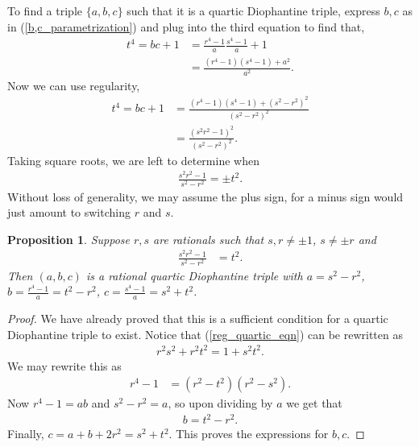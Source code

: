 \documentclass{amsart}
\newtheorem{prop}{Proposition}
\begin{document}
To find a triple $\{a,b,c\}$ such that it is a quartic Diophantine triple, express $b,c$ as in (\ref{b,c_parametrization}) and plug into the third equation to find that,
\begin{align*}
    t^4 = bc+1&= \frac{r^4-1}{a}\frac{s^4-1}{a}+1\\
        &= \frac{(r^4-1)(s^4-1)+a^2}{a^2}.
\end{align*}
Now we can use regularity,
\begin{align*}
    t^4 = bc+1 &= \frac{(r^4-1)(s^4-1)+(s^2-r^2)^2}{(s^2-r^2)^2}\\
    &= \frac{(s^2r^2-1)^2}{(s^2-r^2)^2}.
\end{align*}
Taking square roots, we are left to determine when
\begin{align*}
    \frac{s^2r^2-1}{s^2-r^2} = \pm t^2.
\end{align*}
Without loss of generality, we may assume the plus sign, for a minus sign would just amount to switching $r$ and $s$.
\begin{prop} \label{abc_definition}
Suppose $r,s$ are rationals such that $s,r\neq \pm 1$, $s\neq \pm r$ and
\begin{align} \label{reg_quartic_eqn}
    \frac{s^2r^2-1}{s^2-r^2}&= t^2.
\end{align}
Then $(a,b,c)$ is a rational quartic Diophantine triple with $a=s^2-r^2$,\\ $b=\frac{r^4-1}{a}=t^2-r^2$, $c= \frac{s^4-1}{a} = s^2+t^2$.
\end{prop}
\begin{proof}
We have already proved that this is a sufficient condition for a quartic Diophantine triple to exist. Notice that (\ref{reg_quartic_eqn}) can be rewritten as
    \begin{align*}
        r^2s^2+r^2t^2=1+s^2t^2.
    \end{align*}
We may rewrite this as
    \begin{align*}
        r^4-1&=(r^2-t^2)(r^2-s^2).
    \end{align*}
    Now $r^4-1=ab$ and $s^2-r^2=a$, so upon dividing by $a$ we get that 
    \begin{align*}
        b = t^2-r^2.
    \end{align*}
    Finally, $c=a+b+2r^2=s^2+t^2$. This proves the expressions for $b,c$.
\end{proof}
    
\end{document}
